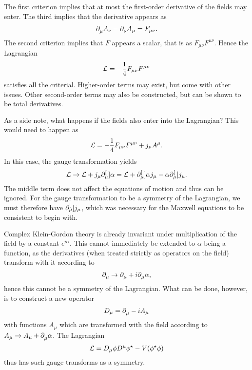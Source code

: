 The first criterion implies that at most the first-order derivative of the fields may enter. The third implies that the derivative appears as
\begin{align*}
	\partial^{}_{\mu}{A_{\nu}} - \partial^{}_{\nu}{A_{\mu}} = F_{\mu\nu}.
\end{align*}
The second criterion implies that $F$ appears a scalar, that is as $F_{\mu\nu}F^{\mu\nu}$. Hence the Lagrangian
\begin{align*}
	\mathcal{L} = -\frac{1}{4}F_{\mu\nu}F^{\mu\nu}
\end{align*}
satisfies all the criterial. Higher-order terms may exist, but come with other issues. Other second-order terms may also be constructed, but can be shown to be total derivatives.

As a side note, what happens if the fields also enter into the Lagrangian? This would need to happen as
\begin{align*}
	\mathcal{L} = -\frac{1}{4}F_{\mu\nu}F^{\mu\nu} + j_{\mu}A^{\mu}.
\end{align*}
In this case, the gauge transformation yields
\begin{align*}
	\mathcal{L} \to \mathcal{L} + j_{\mu}\partial^{[}_{\mu}]{}{\alpha} = \mathcal{L} + \partial^{[}_{\mu}]{}{\alpha j_{\mu}} - \alpha\partial^{[}_{\mu}]{}{j_{\mu}}.
\end{align*}
The middle term does not affect the equations of motion and thus can be ignored. For the gauge transformation to be a symmetry of the Lagrangian, we must therefore have $\partial^{[}_{\mu}]{}{j_{\mu}}$, which was necessary for the Maxwell equations to be consistent to begin with.

Complex Klein-Gordon theory is already invariant under multiplication of the field by a constant $e^{i\alpha}$. This cannot immediately be extended to $\alpha$ being a function, as the derivatives (when treated strictly as operators on the field) transform with it according to
\begin{align*}
	\partial^{}_{\mu}{} \to \partial^{}_{\mu}{} + i\partial^{}_{\mu}{\alpha},
\end{align*}
hence this cannot be a symmetry of the Lagrangian. What can be done, however, is to construct a new operator
\begin{align*}
	D_{\mu} = \partial^{}_{\mu}{} - iA_{\mu}
\end{align*}
with functions $A_{\mu}$ which are transformed with the field according to $A_{\mu} \to A_{\mu} + \partial^{}_{\mu}{\alpha}$. The Lagrangian
\begin{align*}
	\mathcal{L} = D_{\mu}\phi D^{\mu}\phi^{\star} - V(\phi^{\star}\phi)
\end{align*}
thus has such gauge transforms as a symmetry.

